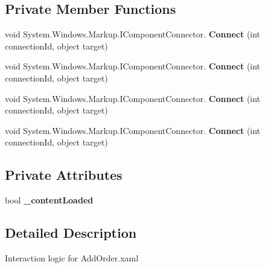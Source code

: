 \subsection*{Private Member Functions}
\begin{DoxyCompactItemize}
\item 
\mbox{\label{class_t_h_b___plugin___orders_1_1_add_order_abbc9a83974ca159364b21ec868014332}} 
void System.\+Windows.\+Markup.\+I\+Component\+Connector. {\bfseries Connect} (int connection\+Id, object target)
\item 
\mbox{\label{class_t_h_b___plugin___orders_1_1_add_order_abbc9a83974ca159364b21ec868014332}} 
void System.\+Windows.\+Markup.\+I\+Component\+Connector. {\bfseries Connect} (int connection\+Id, object target)
\item 
\mbox{\label{class_t_h_b___plugin___orders_1_1_add_order_abbc9a83974ca159364b21ec868014332}} 
void System.\+Windows.\+Markup.\+I\+Component\+Connector. {\bfseries Connect} (int connection\+Id, object target)
\item 
\mbox{\label{class_t_h_b___plugin___orders_1_1_add_order_abbc9a83974ca159364b21ec868014332}} 
void System.\+Windows.\+Markup.\+I\+Component\+Connector. {\bfseries Connect} (int connection\+Id, object target)
\end{DoxyCompactItemize}
\subsection*{Private Attributes}
\begin{DoxyCompactItemize}
\item 
\mbox{\label{class_t_h_b___plugin___orders_1_1_add_order_a7f35054689e2db409071ef4196268410}} 
bool {\bfseries \+\_\+content\+Loaded}
\end{DoxyCompactItemize}


\subsection{Detailed Description}
Interaction logic for Add\+Order.\+xaml 

